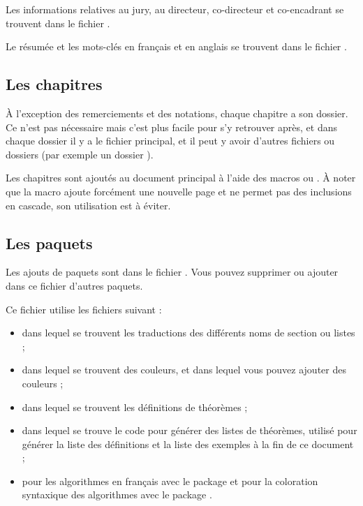   Les informations relatives au jury, au directeur, co-directeur et co-encadrant se trouvent dans le fichier .
  
  Le résumée et les mots-clés en français et en anglais se trouvent dans le fichier .
  
  \subsection{Les chapitres}
  À l'exception des remerciements et des notations, chaque chapitre a son dossier. 
  Ce n'est pas nécessaire mais c'est plus facile pour s'y retrouver après, et dans chaque dossier il y a le fichier principal, et il peut y avoir d'autres fichiers ou dossiers (par exemple un dossier ).
  
  Les chapitres sont ajoutés au document principal à l'aide des macros \verb|| ou \verb||. À noter que la macro \verb|| ajoute forcément une nouvelle page et ne permet pas des inclusions en cascade, son utilisation est à éviter.
  
  \subsection{Les paquets}
  Les ajouts de paquets sont dans le fichier . Vous pouvez supprimer ou ajouter dans ce fichier d'autres paquets. 
  
  Ce fichier utilise les fichiers suivant :
  \begin{itemize}
    \item {} dans lequel se trouvent les traductions des différents noms de section ou listes ;
    \item {} dans lequel se trouvent des couleurs, et dans lequel vous pouvez ajouter des couleurs ;
    \item {} dans lequel se trouvent les définitions de théorèmes ;
    \item {} dans lequel se trouve le code pour générer des listes de théorèmes, utilisé pour générer la liste des définitions et la liste des exemples à la fin de ce document ;
    \item {} pour les algorithmes en français avec le package  et  pour la coloration syntaxique des algorithmes avec le package .
  \end{itemize}

